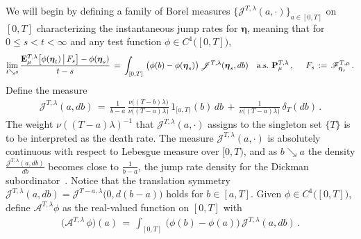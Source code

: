 \documentclass[10pt]{article}
\numberwithin{equation}{section}
\theoremstyle{definition}
\begin{document}
We will begin by defining a family of Borel measures $\{\mathscr{J}^{T,\lambda }(a,\cdot) \}_{a\in [0,T]}$  on $[0,T]$ characterizing the instantaneous jump rates for $\boldsymbol{\eta}$, meaning that 
 for $ 0\leq  s <  t <\infty$ and any test function $\phi\in C^{1}\big([0,T]\big)$, 
\begin{align*}
 \lim_{t\searrow s} \frac{\mathbf{E}^{T,\lambda}_{\mu}\big[ \phi(\boldsymbol{\eta}_t)\,\big|\, F_s \big] -\phi(\boldsymbol{\eta}_s  )}{t-s} \,=\,\int_{[0,T]}\, \big(\phi(b)-\phi(\boldsymbol{\eta}_s)  \big) \, \mathscr{J}^{T,\lambda } (\boldsymbol{\eta}_s,db)\quad \textup{a.s.}\,\,\mathbf{P}^{T,\lambda}_{\mu}\,, \hspace{.5cm}  F_s\,:=\,\mathscr{F}_{\boldsymbol{\eta}_s}^{T,\mu}\,.
\end{align*}
Define the measure 
\begin{align}\label{JUMPFORM}
\mathscr{J}^{T,\lambda } (a,db)\,=\,  \frac{1}{b-a}\,\frac{  \nu\big((T-b )\lambda \big) }{  \nu\big((T-a)\lambda \big)  }\,1_{ [a,T) }(b)\, db\,+\,  \frac{1}{\nu\big((T-a) \lambda\big)} \,\delta_{T}(db) \,.
\end{align}
  The weight  $\nu((T-a) \lambda)^{-1}$ that $\mathscr{J}^{T,\lambda}(a,\cdot)$ assigns to the singleton set $\{T\}$ is to be interpreted as  the death rate.  The measure $\mathscr{J}^{T,\lambda}(a,\cdot)$ is absolutely continuous with respect to Lebesgue measure over  $[0,T)$, and as $b\searrow a$  the  density $\frac{\mathscr{J}^{T,\lambda } (a,db)}{db}$ becomes close to $\frac{1}{b-a}$,  the jump rate density for the Dickman subordinator~\cite{CSZ2}.  Notice that the translation   symmetry $ \mathscr{J}^{T,\lambda }(a,db)= \mathscr{J}^{T-a,\lambda }\big(0,d(b-a)\big)  $ holds for $b\in [a,T]$.   Given  $\phi\in C^{1}\big([0,T]\big)$, define $\mathcal{A}^{T,\lambda}\phi$ as the real-valued function on $[0,T]$ with
\begin{align*}
\big(\mathcal{A}^{T,\lambda}\,\phi\big)(a) \,=\,
\int_{[0,T]} \, \big( \phi(b )-\phi( a ) \big)  \, \mathscr{J}^{T, \lambda}(a,db) \,. \nonumber 
\end{align*}
 
\end{document}
